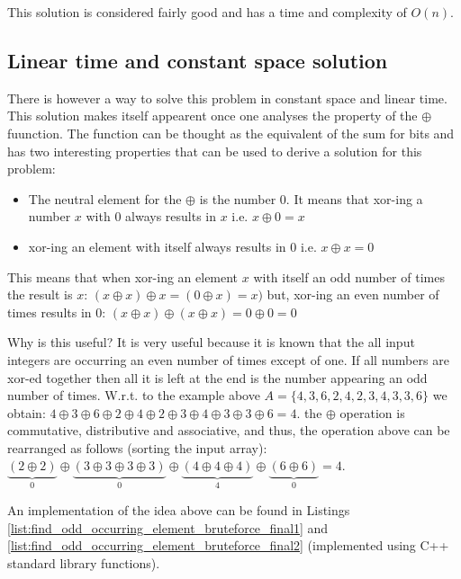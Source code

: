 This solution is considered fairly good and has a time and complexity of $O(n)$.

\subsection{Linear time and constant space solution}
\label{find_odd_occurring_element:sec:constant_space}

There is however a way to solve this problem in constant space and linear time. This solution makes itself appearent once one analyses the property of the $\oplus$ fuunction. 
The  function can be thought as the equivalent of the sum for bits and has two interesting properties that can be used to derive a solution for this problem:
\begin{itemize}
\item The neutral element for the $\oplus$ is the number $0$. It means that xor-ing a number $x$ with $0$ always results in $x$ i.e.  $x \oplus 0 = x$
\item xor-ing an element with itself always results in 0 i.e. $x \oplus x = 0$
\end{itemize}


This means that when xor-ing an element $x$ with itself an odd number of times the result is $x$: $(x \oplus x) \oplus x  = (0 \oplus x) = x)$ but, xor-ing  an even number of times results in $0$:  $(x \oplus x) \oplus (x \oplus x) = 0 \oplus 0  = 0$

Why is this useful? It is very useful because it is known that the all input integers are occurring an even number of times except of one. If all numbers are xor-ed together then all it is left at the end is the number appearing an odd number of times. 
W.r.t. to the example above $A=\{4,3,6,2,4,2,3,4,3,3,6\}$ we obtain: $4 \oplus 3 \oplus  6 \oplus 2 \oplus 4 \oplus 2 \oplus 3 \oplus 4 \oplus 3 \oplus 3 \oplus 6 = 4$. the $\oplus$ operation is commutative, distributive and associative, and thus, the operation above can be rearranged as follows (sorting  the input array): $\underbrace{(2 \oplus 2)}_{0} \oplus \underbrace{(3 \oplus 3 \oplus 3 \oplus 3)}_{0} \oplus \underbrace{(4 \oplus 4 \oplus 4)}_{4} \oplus \underbrace{(6 \oplus 6)}_{0} = 4$.

An implementation of the idea above can be found in Listings \ref{list:find_odd_occurring_element_bruteforce_final1} and \ref{list:find_odd_occurring_element_bruteforce_final2} (implemented using C++ standard library functions).




